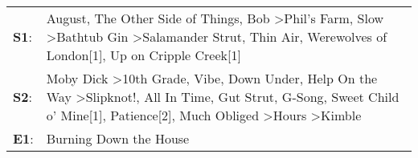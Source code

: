 \begin{supertabular}{p{0.03\textwidth}p{0.92\textwidth}}
 \textbf{S1}:  &                                                                                                                                             August\textsuperscript{}, \enspace The Other Side of Things\textsuperscript{}, \enspace Bob\textsuperscript{} \textgreater \enspace Phil's Farm\textsuperscript{}, \enspace Slow\textsuperscript{} \textgreater \enspace Bathtub Gin\textsuperscript{} \textgreater \enspace Salamander Strut\textsuperscript{}, \enspace Thin Air\textsuperscript{}, \enspace Werewolves of London[1]\textsuperscript{}, \enspace Up on Cripple Creek[1]\textsuperscript{}  \enspace  \\
 \textbf{S2}:  &  Moby Dick\textsuperscript{} \textgreater \enspace 10th Grade\textsuperscript{}, \enspace Vibe\textsuperscript{}, \enspace Down Under\textsuperscript{}, \enspace Help On the Way\textsuperscript{} \textgreater \enspace Slipknot!\textsuperscript{}, \enspace All In Time\textsuperscript{}, \enspace Gut Strut\textsuperscript{}, \enspace G-Song\textsuperscript{}, \enspace Sweet Child o' Mine[1]\textsuperscript{}, \enspace Patience[2]\textsuperscript{}, \enspace Much Obliged\textsuperscript{} \textgreater \enspace Hours\textsuperscript{} \textgreater \enspace Kimble\textsuperscript{}  \enspace  \\
 \textbf{E1}:  &                                                                                                                                                                                                                                                                                                                                                                                                                                                                                                                                                                Burning Down the House\textsuperscript{}  \enspace  \\
\end{supertabular}

